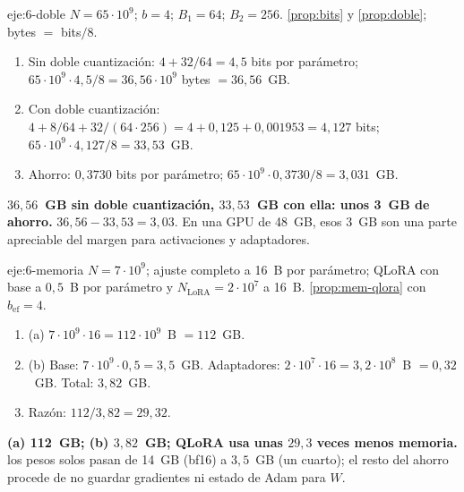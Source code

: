 \begin{solucion}{eje:6-doble}
\datos $N=65\cdot 10^{9}$; $b=4$; $B_1=64$; $B_2=256$.
\planteamiento \cref{prop:bits} y \cref{prop:doble}; bytes $=$ bits$/8$.
\pasos
\begin{enumerate}[label=\arabic*.]
  \item Sin doble cuantización: $4+32/64=4{,}5$ bits por parámetro; $65\cdot 10^{9}\cdot 4{,}5/8=36{,}56\cdot 10^{9}$ bytes $=36{,}56$~GB.
  \item Con doble cuantización: $4+8/64+32/(64\cdot 256)=4+0{,}125+0{,}001953=4{,}127$ bits; $65\cdot 10^{9}\cdot 4{,}127/8=33{,}53$~GB.
  \item Ahorro: $0{,}3730$ bits por parámetro; $65\cdot 10^{9}\cdot 0{,}3730/8=3{,}031$~GB.
\end{enumerate}
\resultado \textbf{$36{,}56$~GB sin doble cuantización, $33{,}53$~GB con ella: unos 3~GB de ahorro.}
\comprobacion $36{,}56-33{,}53=3{,}03$. En una GPU de 48~GB, esos 3~GB son una parte apreciable del margen para activaciones y adaptadores.
\end{solucion}

\begin{solucion}{eje:6-memoria}
\datos $N=7\cdot 10^{9}$; ajuste completo a 16~B por parámetro; QLoRA con base a $0{,}5$~B por parámetro y $N_{\mathrm{LoRA}}=2\cdot 10^{7}$ a 16~B.
\planteamiento \cref{prop:mem-qlora} con $b_{\mathrm{ef}}=4$.
\pasos
\begin{enumerate}[label=\arabic*.]
  \item (a) $7\cdot 10^{9}\cdot 16=112\cdot 10^{9}$~B $=112$~GB.
  \item (b) Base: $7\cdot 10^{9}\cdot 0{,}5=3{,}5$~GB. Adaptadores: $2\cdot 10^{7}\cdot 16=3{,}2\cdot 10^{8}$~B $=0{,}32$~GB. Total: $3{,}82$~GB.
  \item Razón: $112/3{,}82=29{,}32$.
\end{enumerate}
\resultado \textbf{(a) 112~GB; (b) $3{,}82$~GB; QLoRA usa unas $29{,}3$ veces menos memoria.}
\comprobacion los pesos solos pasan de 14~GB (bf16) a $3{,}5$~GB (un cuarto); el resto del ahorro procede de no guardar gradientes ni estado de Adam para $W$.
\end{solucion}

